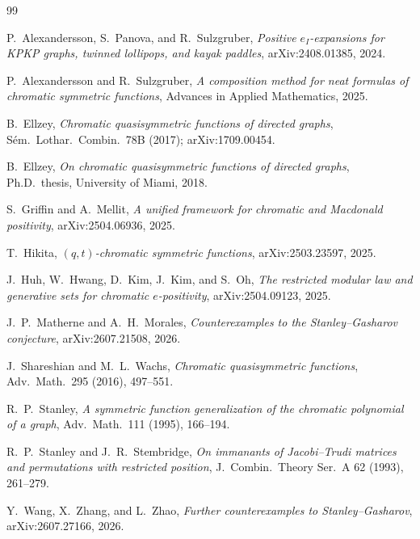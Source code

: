 \documentclass[11pt,a4paper]{amsart}
\theoremstyle{definition}
\begin{document}
\begin{thebibliography}{99}

P.~Alexandersson, S.~Panova, and R.~Sulzgruber,
\emph{Positive $e_I$-expansions for KPKP graphs, twinned lollipops, and kayak paddles},
arXiv:2408.01385, 2024.

P.~Alexandersson and R.~Sulzgruber,
\emph{A composition method for neat formulas of chromatic symmetric functions},
Advances in Applied Mathematics, 2025.

B.~Ellzey,
\emph{Chromatic quasisymmetric functions of directed graphs},
S\'em.\ Lothar.\ Combin.\ 78B (2017); arXiv:1709.00454.

B.~Ellzey,
\emph{On chromatic quasisymmetric functions of directed graphs},
Ph.D.\ thesis, University of Miami, 2018.

S.~Griffin and A.~Mellit,
\emph{A unified framework for chromatic and Macdonald positivity},
arXiv:2504.06936, 2025.

T.~Hikita,
\emph{$(q,t)$-chromatic symmetric functions},
arXiv:2503.23597, 2025.

J.~Huh, W.~Hwang, D.~Kim, J.~Kim, and S.~Oh,
\emph{The restricted modular law and generative sets for chromatic $e$-positivity},
arXiv:2504.09123, 2025.

J.~P.~Matherne and A.~H.~Morales,
\emph{Counterexamples to the Stanley--Gasharov conjecture},
arXiv:2607.21508, 2026.

J.~Shareshian and M.~L.~Wachs,
\emph{Chromatic quasisymmetric functions},
Adv.\ Math.\ 295 (2016), 497--551.

R.~P.~Stanley,
\emph{A symmetric function generalization of the chromatic polynomial of a graph},
Adv.\ Math.\ 111 (1995), 166--194.

R.~P.~Stanley and J.~R.~Stembridge,
\emph{On immanants of Jacobi--Trudi matrices and permutations with restricted position},
J.\ Combin.\ Theory Ser.\ A 62 (1993), 261--279.

Y.~Wang, X.~Zhang, and L.~Zhao,
\emph{Further counterexamples to Stanley--Gasharov},
arXiv:2607.27166, 2026.

\end{thebibliography}
\end{document}
